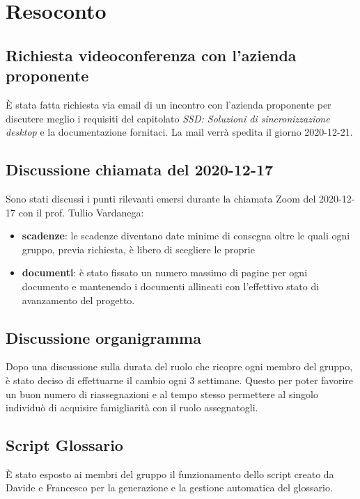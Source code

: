 \newpage


\section{Resoconto}

\subsection{Richiesta videoconferenza con l'azienda proponente}

È stata fatta richiesta via email di un incontro con l'azienda proponente per discutere meglio i requisiti del capitolato \textit{SSD: Soluzioni di sincronizzazione desktop} e la documentazione fornitaci.  
La mail verrà spedita il giorno 2020-12-21.

\subsection{Discussione chiamata del 2020-12-17}

Sono stati discussi i punti rilevanti emersi durante la chiamata Zoom del 2020-12-17 con il prof. Tullio Vardanega:
\begin{itemize}
	\item \textbf{scadenze}: le scadenze diventano date minime di consegna oltre le quali ogni gruppo, previa richiesta, è libero di scegliere le proprie 
	\item \textbf{documenti}: è stato fissato un numero massimo di pagine per ogni documento e mantenendo i documenti allineati con l'effettivo stato di avanzamento del progetto. 
\end{itemize}

\subsection{Discussione organigramma}

Dopo una discussione sulla durata del ruolo che ricopre ogni membro del gruppo, è stato deciso di effettuarne il cambio ogni 3 settimane.
Questo per poter favorire un buon numero di riassegnazioni e al tempo stesso permettere al singolo individuò di acquisire famigliarità con il ruolo assegnatogli.

\subsection{Script Glossario}

È stato esposto ai membri del gruppo il funzionamento dello script creato da Davide e Francesco per la generazione e la gestione automatica del glossario.

